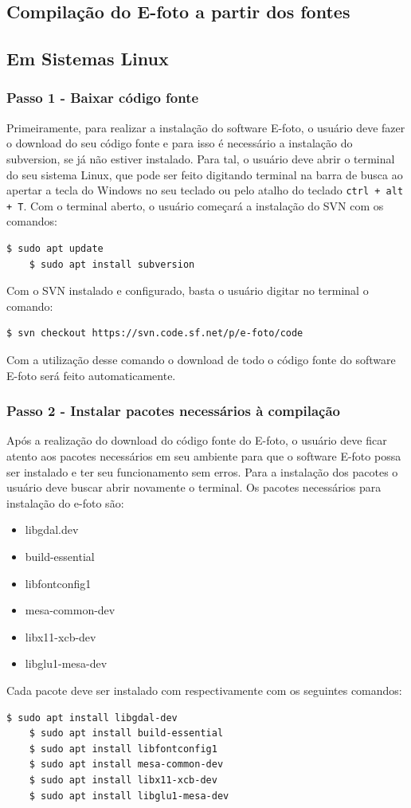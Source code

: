 \subsection{Compilação do E-foto a partir dos fontes}
\subsection{Em Sistemas Linux}

\subsubsection{Passo 1 - Baixar código fonte}
Primeiramente, para realizar a instalação do software E-foto, o usuário deve fazer o download do seu código fonte e para isso é necessário a instalação do subversion, se já não estiver instalado. Para tal, o usuário deve abrir o terminal do seu sistema Linux, que pode ser feito digitando terminal na barra de busca ao apertar a tecla do Windows no seu teclado ou pelo atalho do teclado \texttt{ctrl + alt + T}. Com o terminal aberto, o usuário começará a instalação do SVN com os comandos: 
\begin{lstlisting}[language=bash]
	$ sudo apt update
	$ sudo apt install subversion
\end{lstlisting}

Com o SVN instalado e configurado, basta o usuário digitar no terminal o comando:
\begin{lstlisting}[language=bash]
 $ svn checkout https://svn.code.sf.net/p/e-foto/code
\end{lstlisting}

Com a utilização desse comando o download de todo o código fonte do software E-foto será feito automaticamente.  
    
\subsubsection{Passo 2 - Instalar pacotes necessários à compilação}  
Após a realização do download do código fonte do E-foto, o usuário deve ficar atento aos pacotes necessários em seu ambiente para que o software E-foto possa ser instalado e ter seu funcionamento sem erros. Para a instalação dos pacotes o usuário deve buscar abrir novamente o terminal. Os pacotes necessários para instalação do e-foto são:
\begin{itemize}
   	\item libgdal.dev
   	\item build-essential
   	\item libfontconfig1
   	\item mesa-common-dev
   	\item libx11-xcb-dev
   	\item libglu1-mesa-dev
\end{itemize}
Cada pacote deve ser instalado com respectivamente com os seguintes comandos:	
\begin{lstlisting}[language=bash]
	$ sudo apt install libgdal-dev
	$ sudo apt install build-essential
	$ sudo apt install libfontconfig1
	$ sudo apt install mesa-common-dev
	$ sudo apt install libx11-xcb-dev 
	$ sudo apt install libglu1-mesa-dev
\end{lstlisting}				
	
